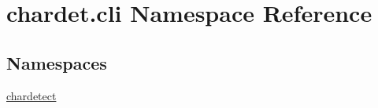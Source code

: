 \hypertarget{namespacechardet_1_1cli}{}\section{chardet.\+cli Namespace Reference}
\label{namespacechardet_1_1cli}
\subsection*{Namespaces}
\begin{DoxyCompactItemize}
\item 
 \hyperlink{namespacechardet_1_1cli_1_1chardetect}{chardetect}
\end{DoxyCompactItemize}
